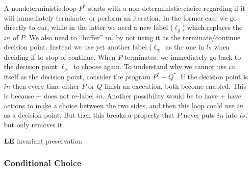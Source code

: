 A nondeterministic loop $P^*$  starts with a non-deterministic choice
regarding if it will immediately terminate,
or perform an iteration.
In the former case we go directly to $out$,
while in the latter we need a new label ($\ell_g$)
which replaces the $in$ of $P$.
We also need to ``buffer'' $in$, by not using it as the terminate/continue
decision point. Instead we use yet another label ($\ell_{g:}$
as the one in $ls$ when deciding if to stop of continue.
When $P$ terminates, we immediately go back to the decision point $\ell_{g:}$
to choose again.
To understand why we cannot use $in$ itself as the decision point,
consider the program $P^*+Q^*$. If the decision point is $in$
then every time either $P$ or $Q$ finish an execution,
both become enabled. This is because $+$ does not re-label $in$.
Another possibility would be to have $+$ have actions to make
a choice between the two sides, and then this loop could
use $in$ as a decision point.
But then this breaks a property that $P$ never puts $in$ into $ls$,
but only removes it.

$\mathbf{LE}$ invariant preservation


\newpage
\subsubsection{Conditional Choice}

